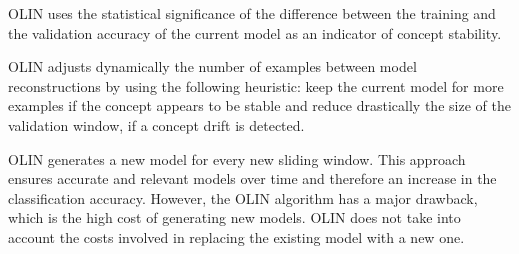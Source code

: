 OLIN uses the statistical significance of the difference between the training and the validation accuracy of the current model as an indicator of concept stability.

OLIN adjusts dynamically the number of examples between model reconstructions
by using the following heuristic: keep the current model for more examples
if the concept appears to be stable and reduce drastically the size of the validation
window, if a concept drift is detected. %
 
OLIN generates a new model for every new sliding window. This approach ensures accurate and relevant models over time and therefore an increase in the classification accuracy. However, the OLIN algorithm has a major drawback, which is the high cost of generating new models. OLIN does not take into account the costs involved in replacing the existing model with a new one. 


